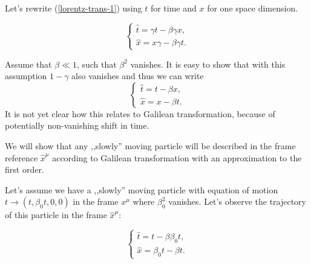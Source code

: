 \documentclass[main.tex]{subfiles}
\begin{document}
Let's rewrite (\ref{lorentz-trans-1}) using $t$ for time and $x$ for one space dimension.

\begin{equation}
\begin{cases}
\hat{t} = \gamma t - \beta \gamma x, \\
\hat{x} = x\gamma - \beta \gamma t. 
\end{cases}
\end{equation}

Assume that $\beta \ll 1$, such that $\beta^2$ vanishes. It is easy to show that with this assumption $1 - \gamma$ also vanishes and thus we can write
\begin{equation}
\label{lorentz-small-velocity}
\begin{cases}
\hat{t} =  t - \beta  x, \\
\hat{x} = x - \beta  t. 
\end{cases}
\end{equation}
It is not yet clear how this relates to Galilean transformation, because of potentially non-vanishing shift in time.

We will show that any ,,slowly'' moving particle will be described in the frame reference $\hat{x}^\mu$ according to Galilean transformation with an approximation to the first order.

Let's assume we have a ,,slowly'' moving particle with equation of motion $t\to (t, \beta_0 t, 0, 0)$ in the frame $x^\mu$ where $\beta_0^2$ vanishes. Let's observe the trajectory of this particle in the frame $\hat{x}^\mu$:

\begin{equation}
\begin{cases}
\hat{t} =  t - \beta  \beta_0 t, \\
\hat{x} = \beta_0 t - \beta  t. 
\end{cases}
\end{equation}
\end{document}
